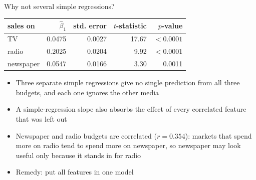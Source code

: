 \begin{frame}{Why not several simple regressions?}
    \begin{center}
        \small
        \begin{tabular}{lrrrr}
            \toprule
            sales on & $\hat\beta_1$ & std. error & $t$-statistic & $p$-value \\
            \midrule
            TV & 0.0475 & 0.0027 & 17.67 & $<0.0001$ \\
            radio & 0.2025 & 0.0204 & 9.92 & $<0.0001$ \\
            newspaper & 0.0547 & 0.0166 & 3.30 & 0.0011 \\
            \bottomrule
        \end{tabular}
    \end{center}
    \begin{itemize}
        \item Three separate simple regressions give no single prediction from all three budgets, and each one ignores the other media
        \item A simple-regression slope also absorbs the effect of every correlated feature that was left out
        \item Newspaper and radio budgets are correlated ($r = 0.354$): markets that spend more on radio tend to spend more on newspaper, so newspaper may look useful only because it stands in for radio
        \item Remedy: put all features in one model
    \end{itemize}
\end{frame}


